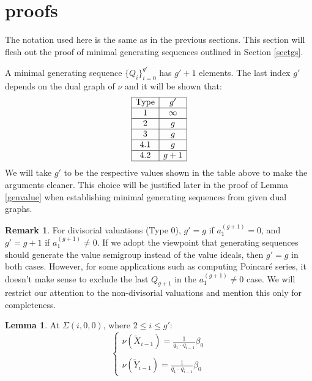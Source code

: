 \documentclass[11pt]{amsart}
\theoremstyle{definition}
\newtheorem{lem}[thm]{Lemma}
\newtheorem*{rem}{Remark}
\begin{document}
{\section{proofs} \label{sectproofs}


The notation used here is the same as in the previous sections. This section will flesh out the proof of minimal generating sequences outlined in Section \ref{sectgs}.

A minimal generating sequence $\{Q_i\}_{i=0}^{g'}$ has $g'+1$ elements. The last index $g'$ depends on the dual graph of $\nu$ and it will be shown that:
\begin{equation*}
\begin{array}{|c|c|} \hline
\text{Type} & g'\\ \hline
1 & \infty \\ \hline
2 & g \\ \hline
3 & g \\ \hline
4.1 & g \\ \hline
4.2 & g+1 \\ \hline
\end{array}
\end{equation*}
We will take $g'$ to be the respective values shown in the table above to make the arguments cleaner. This choice will be justified later in the proof of Lemma \ref{genvalue} when establishing minimal generating sequences from given dual graphs.

\begin{rem}
  For divisorial valuations (Type 0), $g'=g$ if $a_1^{(g+1)}=0$, and $g'=g+1$ if $a_1^{(g+1)}\neq 0$. If we adopt the viewpoint that generating sequences should generate the value semigroup instead of the value ideals, then $g'=g$ in both cases. However, for some applications such as computing Poincar\'e series, it doesn't make sense to exclude the last $Q_{g+1}$ in the $a_{1}^{(g+1)}\neq 0$ case. We will restrict our attention to the non-divisorial valuations and mention this only for completeness.
\end{rem}

\begin{lem} \label{valuetilde} At $\displaystyle \Sigma(i,0,0)$, where $2 \leq i \leq g'$:
\begin{equation*}
\left\{
\begin{array}{l}
\displaystyle \nu(\tilde X_{i-1})=\frac{1}{q_1\cdots q_{i-1}}\beta_0
\\\\
\displaystyle \nu(\tilde Y_{i-1})=\frac{1}{q_1\cdots q_{i-1}}\beta_0
\end{array}
\right.
\end{equation*}
\end{lem}

}
\end{document}
